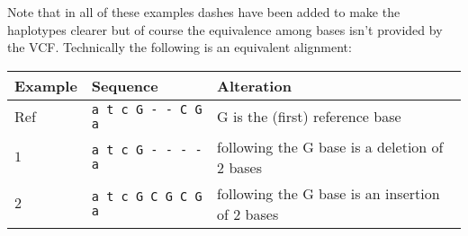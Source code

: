 \documentclass[8pt]{article}
\begin{document}
Note that in all of these examples dashes have been added to make the haplotypes clearer but of course the equivalence among bases isn't provided by the VCF. Technically the following is an equivalent alignment:

\vspace{0.3cm}
\begin{tabular}{ | l | l | l | }
\hline
Example & Sequence & Alteration \\ \hline
Ref & \verb|a t c G - - C G a| & G is the (first) reference base \\ \hline
$1$ & \verb|a t c G - - - - a| & following the G base is a deletion of 2 bases \\ \hline
$2$ & \verb|a t c G C G C G a| & following the G base is an insertion of 2 bases \\ \hline
\end{tabular}
\end{document}
